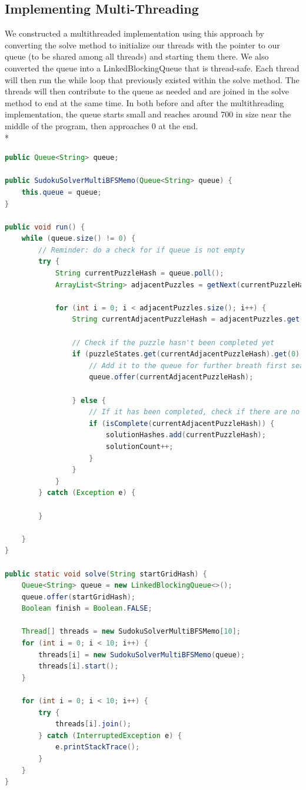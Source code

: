 \documentclass[conference]{IEEEtran}
\begin{document}
\subsection{Implementing Multi-Threading}
We constructed a multithreaded implementation using this approach by converting the solve method to initialize our threads with the pointer to our queue (to be shared among all threads) and starting them there. We also converted the queue into a LinkedBlockingQueue that is thread-safe. Each thread will then run the while loop that previously existed within the solve method. The threads will then contribute to the queue as needed and are joined in the solve method to end at the same time. In both before and after the multithreading implementation, the queue starts small and reaches around 700 in size near the middle of the program, then approaches 0 at the end.
\\*
\begin{lstlisting}[language=Java,numbers=none]
public Queue<String> queue;

public SudokuSolverMultiBFSMemo(Queue<String> queue) {
    this.queue = queue;
}

public void run() {
    while (queue.size() != 0) {
        // Reminder: do a check for if queue is not empty
        try {
            String currentPuzzleHash = queue.poll();
            ArrayList<String> adjacentPuzzles = getNext(currentPuzzleHash);

            for (int i = 0; i < adjacentPuzzles.size(); i++) {
                String currentAdjacentPuzzleHash = adjacentPuzzles.get(i);

                // Check if the puzzle hasn't been completed yet
                if (puzzleStates.get(currentAdjacentPuzzleHash).get(0) <= 8) {
                    // Add it to the queue for further breath first searches if not completed
                    queue.offer(currentAdjacentPuzzleHash);

                } else {
                    // If it has been completed, check if there are no 0s
                    if (isComplete(currentAdjacentPuzzleHash)) {
                        solutionHashes.add(currentPuzzleHash);
                        solutionCount++;
                    }
                }
            }
        } catch (Exception e) {

        }
        
    }
}

public static void solve(String startGridHash) {
    Queue<String> queue = new LinkedBlockingQueue<>();
    queue.offer(startGridHash);
    Boolean finish = Boolean.FALSE;

    Thread[] threads = new SudokuSolverMultiBFSMemo[10];
    for (int i = 0; i < 10; i++) {
        threads[i] = new SudokuSolverMultiBFSMemo(queue);
        threads[i].start();
    }

    for (int i = 0; i < 10; i++) {
        try {
            threads[i].join();
        } catch (InterruptedException e) {
            e.printStackTrace();
        }
    }
}
\end{lstlisting}
\end{document}
